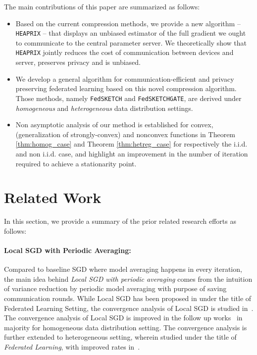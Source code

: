 The main contributions of this paper are summarized as follows:
\begin{itemize}
    \item Based on the current compression methods, we provide a new algorithm -- \texttt{HEAPRIX} -- that displays an unbiased estimator of the full gradient we ought to communicate to the central parameter server. We theoretically show that \texttt{HEAPRIX} jointly reduces the cost of communication between devices and server, preserves privacy and is unbiased.
    
    \item We develop a general algorithm for communication-efficient and privacy preserving federated learning based on this novel compression algorithm. 
Those methods, namely \texttt{FedSKETCH} and \texttt{FedSKETCHGATE}, are derived under \textit{homogeneous} and \textit{heterogeneous} data distribution settings.
   
    \item Non asymptotic analysis of our method is established for convex, \pl\: (generalization of strongly-convex) and nonconvex functions in Theorem \ref{thm:homog_case} and Theorem \ref{thm:hetreg_case} for respectively the i.i.d. and non i.i.d. case,  and highlight an improvement in the number of iteration required to achieve a stationarity point.
\end{itemize}
\section{Related Work}
In this section, we provide a summary of the prior related research efforts as follows:

\paragraph{ Local SGD with Periodic Averaging:}
Compared to baseline SGD where model averaging happens in every iteration, the main idea behind \emph{Local SGD with periodic averaging} comes from the intuition of variance reduction by periodic model averaging \cite{zhang2016parallel} with purpose of saving communication rounds. While Local SGD has been proposed in \cite{mcmahan2016communication,konevcny2016federated} under the title of Federated Learning Setting, the convergence analysis of Local SGD is studied in~\cite{zhou2017convergence,yu2018parallel,stich2018local,wang2018cooperative}. The convergence analysis of Local SGD is improved in the follow up works~\cite{haddadpour2019trading,basu2019qsparse,haddadpour2019convergence,bayoumi2020tighter,stich2019error} in majority for homogeneous data distribution setting. The convergence analysis is further extended to heterogeneous setting, wherein studied under the title of \emph{Federated Learning}, with improved rates in~\cite{yu2019linear,li2019convergence,sahu2018convergence,liang2019variance,haddadpour2019convergence,karimireddy2019scaffold}. 

